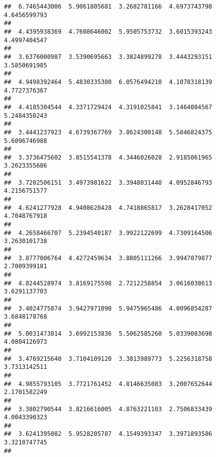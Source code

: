 \documentclass[]{article}
\begin{document}
\begin{verbatim}
##  6.7465443006  5.9061805681  3.2682781166  4.6973743798  4.6456599793 
##                                                                       
##  4.4395938369  4.7608646002  5.9505753732  3.6015393243  4.4997404547 
##                                                                       
##  3.6376000987  3.5390695663  3.3824899278  3.4443293151  3.5850691985 
##                                                                       
##  4.9498392464  5.4830335380  6.0576494210  4.1078318139  4.7727376367 
##                                                                       
##  4.4185304544  4.3371729424  4.3191025841  3.1464084567  5.2484350243 
##                                                                       
##  3.4441237923  4.6739367769  3.8624300148  5.5846824375  5.6096746988 
##                                                                       
##  3.3736475602  3.8515541378  4.3446026028  2.9185061965  3.2623355686 
##                                                                       
##  3.7202506151  3.4973981622  3.3948031448  4.0952846793  4.2156751577 
##                                                                       
##  4.6241277928  4.9408620428  4.7418865817  3.2628417052  4.7048767918 
##                                                                       
##  4.2658466707  5.2394540187  3.9922122699  4.7309164506  3.2630101738 
##                                                                       
##  3.8777006764  4.4272459634  3.8805111266  3.9947079877  2.7009399181 
##                                                                       
##  4.8244528974  3.8169175598  2.7212258854  3.0616038613  3.6291137703 
##                                                                       
##  3.4024775874  3.9427971090  5.9475965486  4.0096854287  3.6848178768 
##                                                                       
##  5.0031473814  3.6992153836  5.5062585260  5.0339083698  4.0804126973 
##                                                                       
##  3.4769215640  3.7104109120  3.3813989773  5.2256318758  3.7313142511 
##                                                                       
##  4.9855793105  3.7721761452  4.8146635083  3.2007652644  2.1701582249 
##                                                                       
##  3.3802790544  3.8216616005  4.8763221103  2.7506833439  4.0043390323 
##                                                                       
##  3.6241395082  5.9528205787  4.1549393347  3.3971893586  3.3210747745 
##                                                                       

\end{verbatim}
\end{document}

